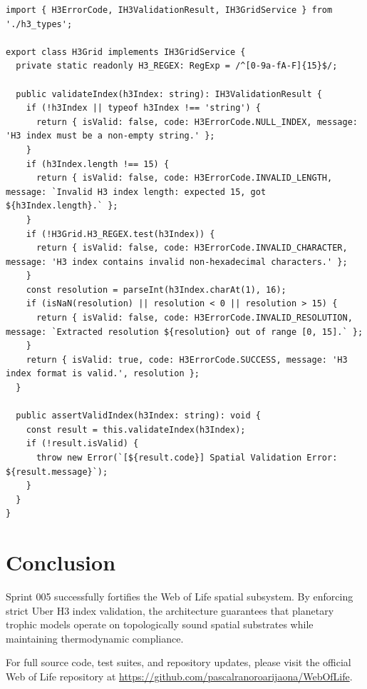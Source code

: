\documentclass[11pt, a4paper]{article}
\begin{document}
\begin{lstlisting}
import { H3ErrorCode, IH3ValidationResult, IH3GridService } from './h3_types';

export class H3Grid implements IH3GridService {
  private static readonly H3_REGEX: RegExp = /^[0-9a-fA-F]{15}$/;

  public validateIndex(h3Index: string): IH3ValidationResult {
    if (!h3Index || typeof h3Index !== 'string') {
      return { isValid: false, code: H3ErrorCode.NULL_INDEX, message: 'H3 index must be a non-empty string.' };
    }
    if (h3Index.length !== 15) {
      return { isValid: false, code: H3ErrorCode.INVALID_LENGTH, message: `Invalid H3 index length: expected 15, got ${h3Index.length}.` };
    }
    if (!H3Grid.H3_REGEX.test(h3Index)) {
      return { isValid: false, code: H3ErrorCode.INVALID_CHARACTER, message: 'H3 index contains invalid non-hexadecimal characters.' };
    }
    const resolution = parseInt(h3Index.charAt(1), 16);
    if (isNaN(resolution) || resolution < 0 || resolution > 15) {
      return { isValid: false, code: H3ErrorCode.INVALID_RESOLUTION, message: `Extracted resolution ${resolution} out of range [0, 15].` };
    }
    return { isValid: true, code: H3ErrorCode.SUCCESS, message: 'H3 index format is valid.', resolution };
  }

  public assertValidIndex(h3Index: string): void {
    const result = this.validateIndex(h3Index);
    if (!result.isValid) {
      throw new Error(`[${result.code}] Spatial Validation Error: ${result.message}`);
    }
  }
}
\end{lstlisting}

\section{Conclusion}
Sprint 005 successfully fortifies the Web of Life spatial subsystem. By enforcing strict Uber H3 index validation, the architecture guarantees that planetary trophic models operate on topologically sound spatial substrates while maintaining thermodynamic compliance.

For full source code, test suites, and repository updates, please visit the official Web of Life repository at \url{https://github.com/pascalranoroarijaona/WebOfLife}.
\end{document}
